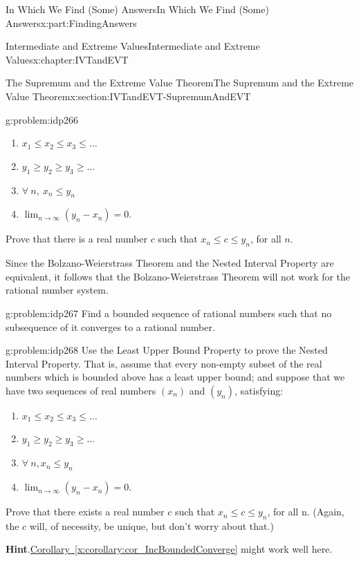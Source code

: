 \documentclass[oneside,10pt,]{book}
\newcommand{\blocktitlefont}{\relax}
\newcommand{\xreffont}{\relax}
\numberwithin{equation}{section}
\begin{document}
\begin{partptx}{In Which We Find (Some) Answers}{}{In Which We Find (Some) Answers}{}{}{x:part:FindingAnswers}
\begin{chapterptx}{Intermediate and Extreme Values}{}{Intermediate and Extreme Values}{}{}{x:chapter:IVTandEVT}
\begin{sectionptx}{The Supremum and the Extreme Value Theorem}{}{The Supremum and the Extreme Value Theorem}{}{}{x:section:IVTandEVT-SupremumAndEVT}
\begin{problem}{}{g:problem:idp266}
\begin{enumerate}
\item{}\(\displaystyle x_1\le x_2 \le x_3 \le \ldots\)%
\item{}\(\displaystyle y_1\ge y_2 \ge y_3 \ge \ldots\)%
\item{}\(\displaystyle \forall\ n,\ x_n\le y_n\)%
\item{}\(\displaystyle\lim_{n\rightarrow\infty}\left(y_n-x_n\right) = 0\).%
\end{enumerate}
%
\par
Prove that there is a real number \(c\) such that \(x_n\le c\le y_n\), for all \(n\).%
\end{problem}
Since the Bolzano-Weierstrass Theorem and the Nested Interval Property are equivalent, it follows that the Bolzano-Weierstrass Theorem will not work for the rational number system.%
\begin{problem}{}{g:problem:idp267}%
 Find a bounded sequence of rational numbers such that no subsequence of it converges to a rational number.%
\end{problem}
\begin{problem}{}{g:problem:idp268}%
 Use the Least Upper Bound Property to prove the Nested Interval Property. That is, assume that every non-empty subset of the real numbers which is bounded above has a least upper bound; and suppose that we have two sequences of real numbers \(\left(x_n\right)\) and \(\left(y_n\right)\), satisfying:%
\begin{enumerate}
\item{}\(\displaystyle x_1\le x_2 \le x_3 \le \ldots\)%
\item{}\(\displaystyle y_1\ge y_2 \ge y_3 \ge \ldots\)%
\item{}\(\displaystyle \forall\ n, x_n\le y_n\)%
\item{}\(\displaystyle\lim_{n\rightarrow\infty}\left(y_n-x_n\right) = 0\).%
\end{enumerate}
%
\par
Prove that there exists a real number \(c\) such that \(x_n\le c\le y_n\), for all n. (Again, the \(c\) will, of necessity, be unique, but don't worry about that.)%
\par\smallskip%
\noindent\textbf{\blocktitlefont Hint}.\hypertarget{g:hint:idp269}{}\quad{}\hyperref[x:corollary:cor_IncBoundedConverge]{Corollary~{\xreffont\ref{x:corollary:cor_IncBoundedConverge}}} might work well here.%

\end{problem}
\end{sectionptx}
\end{chapterptx}
\end{partptx}
\end{document}
